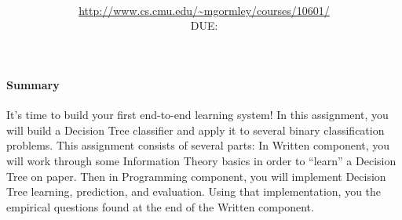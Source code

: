 \documentclass[11pt,addpoints,answers]{exam}
\title{\textsc{\hwName}
} %
\author{\courseName\\
\url{http://www.cs.cmu.edu/~mgormley/courses/10601/} \\
DUE: \dueDate{} \\ 
}
\date{}
\date{}
\begin{document}
\maketitle

\begin{notebox}
\paragraph{Summary} It's time to build your first end-to-end learning system! In this assignment, you will build a Decision Tree classifier and apply it to several binary classification problems. This assignment consists of several parts: In Written component, you will work through some Information Theory basics in order to ``learn'' a Decision Tree on paper. Then in Programming component, you will implement Decision Tree learning, prediction, and evaluation. Using that implementation, you the empirical questions found at the end of the Written component.
\end{notebox}
\end{document}
